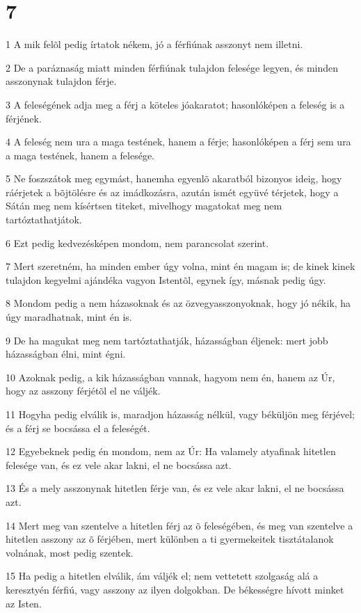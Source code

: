 \chapter{7}

\par 1 A mik felõl pedig írtatok nékem, jó a férfiúnak asszonyt nem illetni.
\par 2 De a paráznaság miatt minden férfiúnak tulajdon felesége legyen, és minden asszonynak tulajdon férje.
\par 3 A feleségének adja meg a férj a köteles jóakaratot; hasonlóképen a feleség is a férjének.
\par 4 A feleség nem ura a maga testének, hanem a férje; hasonlóképen a férj sem ura a maga testének, hanem a felesége.
\par 5 Ne foszszátok meg egymást, hanemha egyenlõ akaratból bizonyos ideig, hogy ráérjetek a bõjtölésre és az imádkozásra, azután ismét együvé térjetek, hogy a Sátán meg nem kísértsen titeket, mivelhogy magatokat meg nem tartóztathatjátok.
\par 6 Ezt pedig kedvezésképen mondom, nem parancsolat szerint.
\par 7 Mert szeretném, ha minden ember úgy volna, mint én magam is; de kinek kinek tulajdon kegyelmi ajándéka vagyon Istentõl, egynek így, másnak pedig úgy.
\par 8 Mondom pedig a nem házasoknak és az özvegyasszonyoknak, hogy jó nékik, ha úgy maradhatnak, mint én is.
\par 9 De ha magukat meg nem tartóztathatják, házasságban éljenek: mert jobb házasságban élni, mint égni.
\par 10 Azoknak pedig, a kik házasságban vannak, hagyom nem én, hanem az Úr, hogy az asszony  férjétõl el ne váljék.
\par 11 Hogyha pedig elválik is, maradjon házasság nélkül, vagy béküljön meg férjével; és a férj se bocsássa el a feleségét.
\par 12 Egyebeknek pedig én mondom, nem az Úr: Ha valamely atyafinak hitetlen felesége van, és ez vele akar lakni, el ne bocsássa azt.
\par 13 És a mely asszonynak hitetlen férje van, és ez vele akar lakni, el ne bocsássa azt.
\par 14 Mert meg van szentelve a hitetlen férj az õ feleségében, és meg van szentelve a hitetlen asszony az õ férjében, mert különben a ti gyermekeitek tisztátalanok volnának, most pedig szentek.
\par 15 Ha pedig a hitetlen elválik, ám váljék el; nem vettetett szolgaság alá a keresztyén férfiú, vagy asszony az ilyen dolgokban. De békességre hívott minket az Isten.
